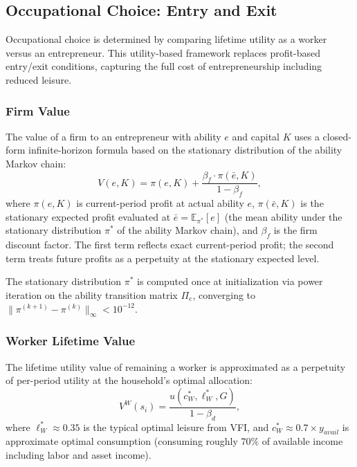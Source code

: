 \documentclass[12pt]{article}
\newcommand{\E}{\mathbb{E}}
\begin{document}
\subsection{Occupational Choice: Entry and Exit}\label{sec:entry_exit}

Occupational choice is determined by comparing lifetime utility as a worker versus an entrepreneur. This utility-based framework replaces profit-based entry/exit conditions, capturing the full cost of entrepreneurship including reduced leisure.

\subsubsection{Firm Value}

The value of a firm to an entrepreneur with ability $e$ and capital $K$ uses a closed-form infinite-horizon formula based on the stationary distribution of the ability Markov chain:
\begin{equation}\label{eq:firm_value}
  V(e, K) = \pi(e, K) + \frac{\beta_f \cdot \pi(\bar{e}, K)}{1 - \beta_f},
\end{equation}
where $\pi(e, K)$ is current-period profit at actual ability $e$, $\pi(\bar{e}, K)$ is the stationary expected profit evaluated at $\bar{e} = \E_{\pi^*}[e]$ (the mean ability under the stationary distribution $\pi^*$ of the ability Markov chain), and $\beta_f$ is the firm discount factor. The first term reflects exact current-period profit; the second term treats future profits as a perpetuity at the stationary expected level.

The stationary distribution $\pi^*$ is computed once at initialization via power iteration on the ability transition matrix $\Pi_e$, converging to $\|\pi^{(k+1)} - \pi^{(k)}\|_\infty < 10^{-12}$.

\subsubsection{Worker Lifetime Value}

The lifetime utility value of remaining a worker is approximated as a perpetuity of per-period utility at the household's optimal allocation:
\begin{equation}\label{eq:worker_value}
  V^W(s_i) = \frac{u(c^*_W, \ell^*_W, G)}{1 - \beta_d},
\end{equation}
where $\ell^*_W \approx 0.35$ is the typical optimal leisure from VFI, and $c^*_W \approx 0.7 \times y_{avail}$ is approximate optimal consumption (consuming roughly 70\% of available income including labor and asset income).
\end{document}
